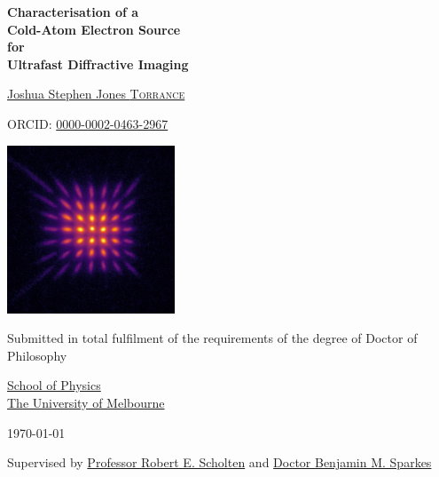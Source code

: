 \begin{titlepage}
    \begin{center}
       
        {\LARGE\textbf{Characterisation of a\\}}
        {\huge\textbf{Cold-Atom Electron Source\\}}
        {\LARGE\textbf{for\\}}
        {\huge\textbf{Ultrafast Diffractive Imaging\\}}
    
        \vspace{2cm}
        
        \href{https://scholar.google.com.au/citations?user=sLp309oAAAAJ}{{\huge Joshua Stephen Jones \textsc{Torrance}}}

        \vspace{0.3cm}

        ORCID: \href{http://orcid.org/0000-0002-0463-2967}{0000-0002-0463-2967}
        
        \vfill
        
        \includegraphics[width=5cm]{0frontmatter/example_pepperpot_detector_linear.jpeg}

        \vfill

        Submitted in total fulfilment of the requirements
        of the degree of Doctor of Philosophy

        \vspace{0.4cm}

        \href{http://physics.unimelb.edu.au}{School of Physics\\
           The University of Melbourne}\\
        
        \vspace{0.4cm}
    
        \today

        \vspace{0.4cm}

        Supervised by \href{https://scholar.google.com.au/citations?user=F3QFcRYAAAAJ}{Professor Robert E. Scholten}
        and \href{https://scholar.google.com.au/citations?user=pqsudawAAAAJ}{Doctor Benjamin M. Sparkes}       
    \end{center}
\end{titlepage}